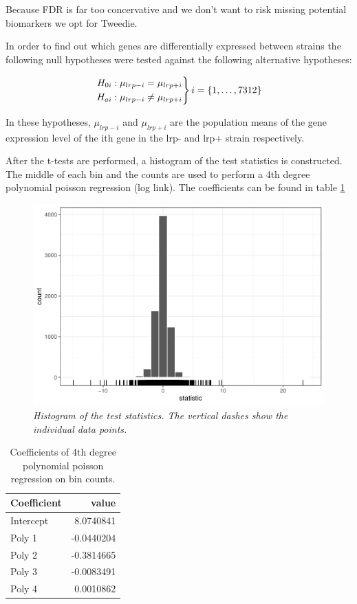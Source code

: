 \documentclass[
]{article}
\begin{document}
Because FDR is far too concervative and we don't want to risk missing potential biomarkers we opt for Tweedie.

In order to find out which genes are differentially expressed between strains the following null hypotheses were tested against the following alternative hypotheses:

\[\left.\begin{aligned} H_{0i}: \mu_{lrp- i} = \mu_{lrp+i} \\ H_{ai}: \mu_{lrp- i}\neq \mu_{lrp+i} \end{aligned} \right \} \space  \space i = \{1,\dots,7312\} \]

In these hypotheses, \(\mu_{lrp-i}\) and \(\mu_{lrp+i}\) are the population means of the gene expression level of the ith gene in the lrp- and lrp+ strain respectively.

After the t-tests are performed, a histogram of the test statistics is constructed. The middle of each bin and the counts are used to perform a 4th degree polynomial poisson regression (log link). The coefficients can be found in table \ref{tab:coef}

\begin{figure}

{\centering \includegraphics[width=0.75\linewidth]{main_files/figure-latex/hist-1} 

}

\caption{\textit{Histogram of the test statistics. The vertical dashes show the individual data points.}}\label{fig:hist}
\end{figure}

\begin{table}

\caption{\label{tab:coef}Coefficients of 4th degree polynomial poisson regression on bin counts.}
\centering
\begin{tabular}[t]{lr}
\toprule
Coefficient & value\\
\midrule
Intercept & 8.0740841\\
Poly 1 & -0.0440204\\
Poly 2 & -0.3814665\\
Poly 3 & -0.0083491\\
Poly 4 & 0.0010862\\
\bottomrule
\end{tabular}
\end{table}
\end{document}
